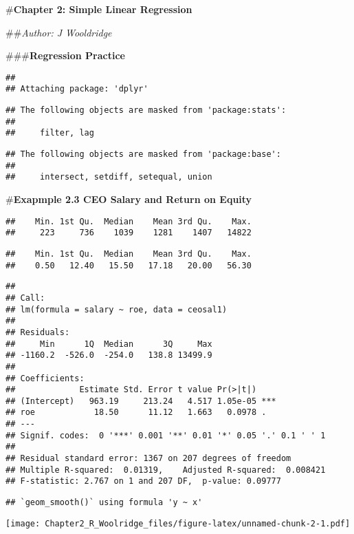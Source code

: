 \documentclass[
]{article}
\author{}
\date{\vspace{-2.5em}}
\begin{document}
\#\textbf{Chapter 2: Simple Linear Regression}

\#\#\emph{Author: J Wooldridge}

\#\#\#\textbf{Regression Practice}

\begin{verbatim}
## 
## Attaching package: 'dplyr'
\end{verbatim}

\begin{verbatim}
## The following objects are masked from 'package:stats':
## 
##     filter, lag
\end{verbatim}

\begin{verbatim}
## The following objects are masked from 'package:base':
## 
##     intersect, setdiff, setequal, union
\end{verbatim}

\#\textbf{Exapmple 2.3 CEO Salary and Return on Equity}

\begin{verbatim}
##    Min. 1st Qu.  Median    Mean 3rd Qu.    Max. 
##     223     736    1039    1281    1407   14822
\end{verbatim}

\begin{verbatim}
##    Min. 1st Qu.  Median    Mean 3rd Qu.    Max. 
##    0.50   12.40   15.50   17.18   20.00   56.30
\end{verbatim}

\begin{verbatim}
## 
## Call:
## lm(formula = salary ~ roe, data = ceosal1)
## 
## Residuals:
##     Min      1Q  Median      3Q     Max 
## -1160.2  -526.0  -254.0   138.8 13499.9 
## 
## Coefficients:
##             Estimate Std. Error t value Pr(>|t|)    
## (Intercept)   963.19     213.24   4.517 1.05e-05 ***
## roe            18.50      11.12   1.663   0.0978 .  
## ---
## Signif. codes:  0 '***' 0.001 '**' 0.01 '*' 0.05 '.' 0.1 ' ' 1
## 
## Residual standard error: 1367 on 207 degrees of freedom
## Multiple R-squared:  0.01319,    Adjusted R-squared:  0.008421 
## F-statistic: 2.767 on 1 and 207 DF,  p-value: 0.09777
\end{verbatim}

\begin{verbatim}
## `geom_smooth()` using formula 'y ~ x'
\end{verbatim}

\texttt{[image: Chapter2\_R\_Woolridge\_files/figure-latex/unnamed-chunk-2-1.pdf]}
\end{document}
